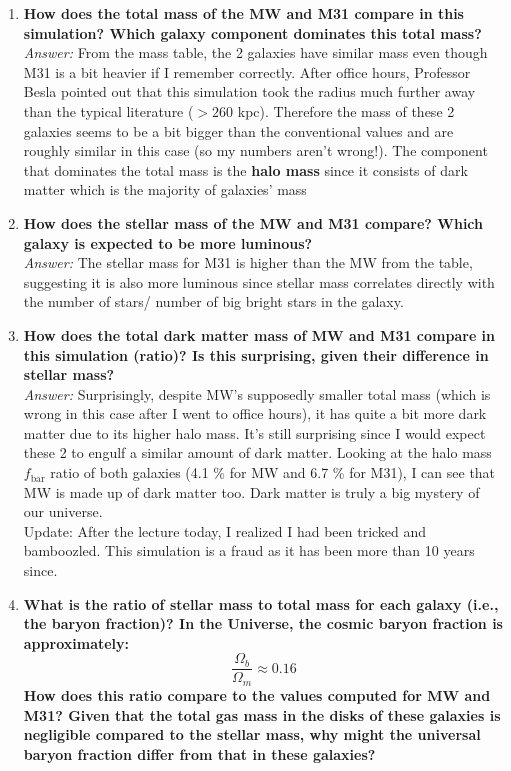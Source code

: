 \documentclass{article}
\begin{document}
\begin{enumerate}
    \item \textbf{How does the total mass of the MW and M31 compare in this simulation? Which galaxy component dominates this total mass?} \\ [4pt] 
    \textit{Answer:} From the mass table, the 2 galaxies have similar mass even though M31 is a bit heavier if I remember correctly. After office hours, Professor Besla pointed out that this simulation took the radius much further away than the typical literature ($> 260$ kpc). Therefore the mass of these 2 galaxies seems to be a bit bigger than the conventional values and are roughly similar in this case (so my numbers aren't wrong!). The component that dominates the total mass is the \textbf{halo mass} since it consists of dark matter which is the majority of galaxies' mass

    \item \textbf{How does the stellar mass of the MW and M31 compare? Which galaxy is expected to be more luminous? } \\ [4pt]
    \textit{Answer:} The stellar mass for M31 is higher than the MW from the table, suggesting it is also more luminous since stellar mass correlates directly with the number of stars/ number of big bright stars in the galaxy. 

    \item \textbf{How does the total dark matter mass of MW and M31 compare in this simulation (ratio)? Is this surprising, given their difference in stellar mass?} \\ [4pt]
    \textit{Answer:} Surprisingly, despite MW's supposedly smaller total mass (which is wrong in this case after I went to office hours), it has quite a bit more dark matter due to its higher halo mass. It's still surprising since I would expect these 2 to engulf a similar amount of dark matter. Looking at the halo mass\textbf{\( f_{\text{bar}}\)} ratio of both galaxies (4.1 \% for MW and 6.7 \% for M31), I can see that MW is made up of dark matter too. Dark matter is truly a big mystery of our universe.\\ 
    Update: After the lecture today, I realized I had been tricked and bamboozled. This simulation is a fraud as it has been more than 10 years since. 

    \item \textbf{ What is the ratio of stellar mass to total mass for each galaxy (i.e., the baryon fraction)? In the Universe, the cosmic baryon fraction is approximately:
    \[
    \frac{\Omega_b}{\Omega_m} \approx 0.16
    \]
    How does this ratio compare to the values computed for MW and M31? Given that the total gas mass in the disks of these galaxies is negligible compared to the stellar mass, why might the universal baryon fraction differ from that in these galaxies?}  \\ [4pt]
   

\end{enumerate}
\end{document}
